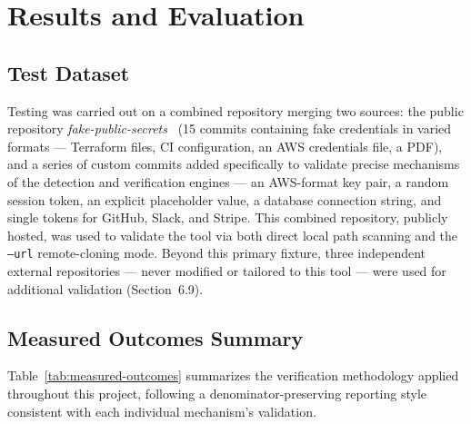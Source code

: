 \documentclass[12pt]{article}
\begin{document}
\newpage


\section{Results and Evaluation}

\subsection{Test Dataset}

Testing was carried out on a combined repository merging two sources: the public repository \emph{fake-public-secrets}~\cite{fakepublicsecrets} (15 commits containing fake credentials in varied formats --- Terraform files, CI configuration, an AWS credentials file, a PDF), and a series of custom commits added specifically to validate precise mechanisms of the detection and verification engines --- an AWS-format key pair, a random session token, an explicit placeholder value, a database connection string, and single tokens for GitHub, Slack, and Stripe. This combined repository, publicly hosted, was used to validate the tool via both direct local path scanning and the \texttt{--url} remote-cloning mode. Beyond this primary fixture, three independent external repositories --- never modified or tailored to this tool --- were used for additional validation (Section~6.9).

\subsection{Measured Outcomes Summary}

Table~\ref{tab:measured-outcomes} summarizes the verification methodology applied throughout this project, following a denominator-preserving reporting style consistent with each individual mechanism's validation.
\end{document}
